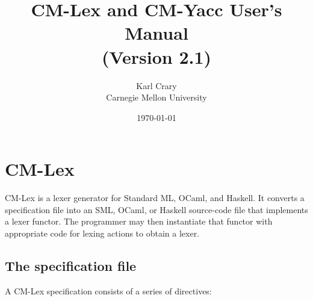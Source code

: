 \documentclass[10pt]{article}
\title{CM-Lex and CM-Yacc User's Manual \\ \Large
(Version 2.1)}
\author{Karl Crary \\ Carnegie Mellon University}
\date{\today}
\begin{document}
\maketitle

\section{CM-Lex}

CM-Lex is a lexer generator for Standard ML, OCaml, and Haskell.  It converts
a specification file into an SML, OCaml, or Haskell source-code file that
implements a lexer functor.  The programmer may then instantiate that
functor with appropriate code for lexing actions to obtain a lexer.

\subsection{The specification file}

A CM-Lex specification consists of a series of directives:
\end{document}
